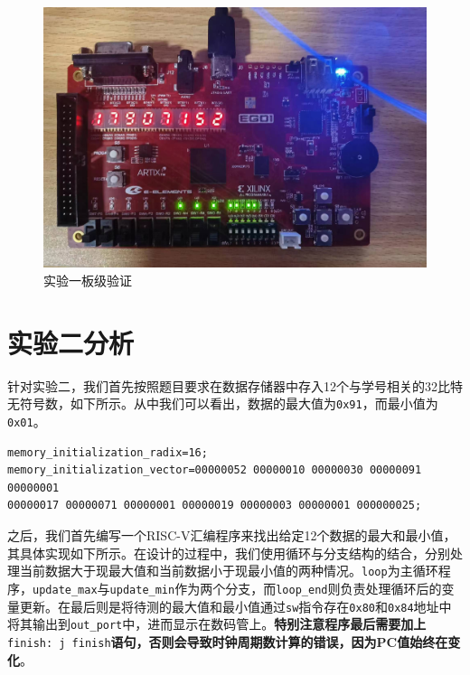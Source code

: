 \documentclass[a4paper,12pt]{article}
\begin{document}
    \begin{figure}[htbp]
        \centering
        \includegraphics[scale=0.15]{fig1.jpg}
        \caption{实验一板级验证}
        \label{fig:lab1_board}
    \end{figure}

    \section{实验二分析}

    针对实验二，我们首先按照题目要求在数据存储器中存入12个与学号相关的32比特无符号数，如下所示。从中我们可以看出，数据的最大值为\verb|0x91|，而最小值为\verb|0x01|。

    \begin{lstlisting}
memory_initialization_radix=16;
memory_initialization_vector=00000052 00000010 00000030 00000091 00000001 
00000017 00000071 00000001 00000019 00000003 00000001 000000025;
    \end{lstlisting}

    之后，我们首先编写一个RISC-V汇编程序来找出给定12个数据的最大和最小值，其具体实现如下所示。在设计的过程中，我们使用循环与分支结构的结合，分别处理当前数据大于现最大值和当前数据小于现最小值的两种情况。\verb|loop|为主循环程序，\verb|update_max|与\verb|update_min|作为两个分支，而\verb|loop_end|则负责处理循环后的变量更新。在最后则是将待测的最大值和最小值通过\verb|sw|指令存在\verb|0x80|和\verb|0x84|地址中将其输出到\verb|out_port|中，进而显示在数码管上。\textbf{特别注意程序最后需要加上}\verb|finish: j finish|\textbf{语句，否则会导致时钟周期数计算的错误，因为PC值始终在变化}。
\end{document}
